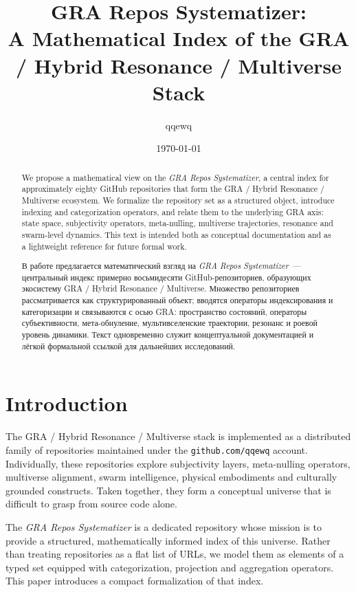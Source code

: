 \documentclass[11pt,a4paper]{article}
\title{GRA Repos Systematizer:\\
A Mathematical Index of the GRA / Hybrid Resonance / Multiverse Stack}
\author{qqewq}
\date{\today}
\begin{document}
\maketitle


\begin{abstract}
We propose a mathematical view on the \emph{GRA Repos Systematizer}, 
a central index for approximately eighty GitHub repositories that form the
GRA / Hybrid Resonance / Multiverse ecosystem.
We formalize the repository set as a structured object, introduce
indexing and categorization operators, and relate them to the underlying
GRA axis: state space, subjectivity operators, meta-nulling, multiverse
trajectories, resonance and swarm-level dynamics.
This text is intended both as conceptual documentation and as a
lightweight reference for future formal work.
\end{abstract}


\begin{abstract}
В работе предлагается математический взгляд на \emph{GRA Repos Systematizer}~---
центральный индекс примерно восьмидесяти GitHub-репозиториев, образующих
экосистему GRA / Hybrid Resonance / Multiverse.
Множество репозиториев рассматривается как структурированный объект; вводятся
операторы индексирования и категоризации и связываются с осью GRA:
пространство состояний, операторы субъективности, мета-обнуление,
мультивселенские траектории, резонанс и роевой уровень динамики.
Текст одновременно служит концептуальной документацией и лёгкой
формальной ссылкой для дальнейших исследований.
\end{abstract}


\section{Introduction}

The GRA / Hybrid Resonance / Multiverse stack is implemented as a
distributed family of repositories maintained under the
\texttt{github.com/qqewq} account.
Individually, these repositories explore subjectivity layers, meta-nulling
operators, multiverse alignment, swarm intelligence, physical embodiments
and culturally grounded constructs.
Taken together, they form a conceptual universe that is difficult to
grasp from source code alone.

The \emph{GRA Repos Systematizer} is a dedicated repository whose mission
is to provide a structured, mathematically informed index of this universe.
Rather than treating repositories as a flat list of URLs, we model them as
elements of a typed set equipped with categorization, projection and
aggregation operators.
This paper introduces a compact formalization of that index.
\end{document}
